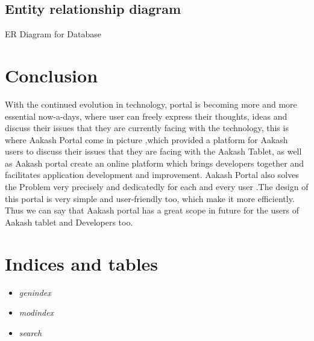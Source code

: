 \documentclass[letterpaper,10pt,english]{sphinxmanual}
\begin{document}
\section{Entity relationship diagram}
\label{unifieddoc:entity-relationship-diagram}\begin{figure}[htbp]
\centering

\end{figure}

ER Diagram for Database


\chapter{Conclusion}
\label{unifieddoc:conclusion}
With the continued evolution in technology, portal is becoming more and more essential now-a-days, where user can freely express their thoughts, ideas and discuss their issues that they are currently facing with the technology, this is where Aakash Portal come in picture ,which provided a platform for Aakash users to discuss their issues that they are facing with the Aakash Tablet, as well as Aakash portal create an online platform which brings developers together and facilitates application development and improvement. Aakash Portal also solves the Problem very precisely and dedicatedly for each and every user .The design of this portal is very simple and user-friendly too, which make it more efficiently. Thus we can say that Aakash portal has a great scope in future for the users of Aakash tablet and Developers too.


\chapter{Indices and tables}
\label{index:indices-and-tables}\begin{itemize}
\item {} 
\emph{genindex}

\item {} 
\emph{modindex}

\item {} 
\emph{search}

\end{itemize}



\renewcommand{\indexname}{Index}
\printindex
\end{document}
